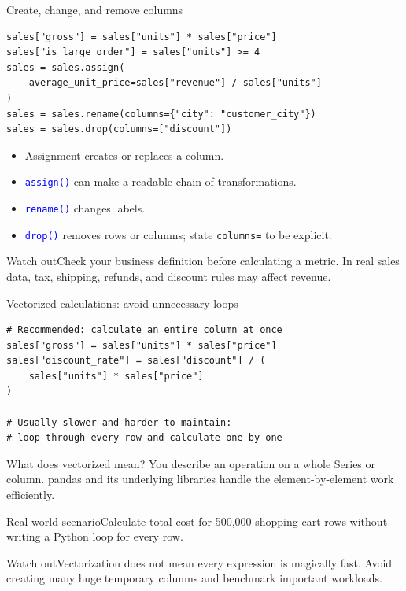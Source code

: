 \documentclass[aspectratio=169,10pt]{beamer}
\newcommand{\scenario}[1]{\begin{block}{Real-world scenario}#1\end{block}}
\newcommand{\pitfall}[1]{\begin{alertblock}{Watch out}#1\end{alertblock}}
\newcommand{\method}[1]{\texttt{\textcolor{Blue}{#1}}}
\begin{document}
\begin{frame}[fragile]{Create, change, and remove columns}
\begin{lstlisting}
sales["gross"] = sales["units"] * sales["price"]
sales["is_large_order"] = sales["units"] >= 4
sales = sales.assign(
    average_unit_price=sales["revenue"] / sales["units"]
)
sales = sales.rename(columns={"city": "customer_city"})
sales = sales.drop(columns=["discount"])
\end{lstlisting}
\begin{itemize}
\item Assignment creates or replaces a column.
\item \method{assign()} can make a readable chain of transformations.
\item \method{rename()} changes labels.
\item \method{drop()} removes rows or columns; state \texttt{columns=} to be explicit.
\end{itemize}
\pitfall{Check your business definition before calculating a metric. In real sales data, tax, shipping, refunds, and discount rules may affect revenue.}
\end{frame}

\begin{frame}[fragile]{Vectorized calculations: avoid unnecessary loops}
\begin{lstlisting}
# Recommended: calculate an entire column at once
sales["gross"] = sales["units"] * sales["price"]
sales["discount_rate"] = sales["discount"] / (
    sales["units"] * sales["price"]
)

# Usually slower and harder to maintain:
# loop through every row and calculate one by one
\end{lstlisting}
\begin{block}{What does vectorized mean?}
You describe an operation on a whole Series or column. pandas and its underlying libraries handle the element-by-element work efficiently.
\end{block}
\scenario{Calculate total cost for 500,000 shopping-cart rows without writing a Python loop for every row.}
\pitfall{Vectorization does not mean every expression is magically fast. Avoid creating many huge temporary columns and benchmark important workloads.}
\end{frame}
\end{document}
